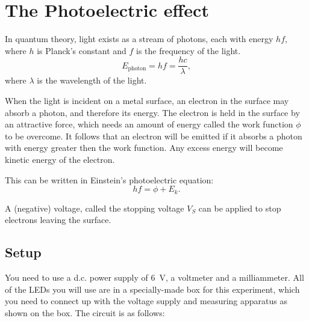 \section{The Photoelectric effect}
\label{photoelectric}

In quantum theory, light exists as a stream of photons, each with energy $hf$, where $h$ is Planck's constant and $f$ is the frequency of the light.
\[E_{\text{photon}}=hf=\frac{hc}{\lambda},\]
where $\lambda$ is the wavelength of the light.

When the light is incident on a metal surface, an electron in the surface may absorb a photon, and therefore its energy.  The electron is held in the surface by an attractive force, which needs an amount of energy called the work function $\phi$ to be overcome.  It follows that an electron will be emitted if it absorbs a photon with energy greater then the work function.  Any excess energy will become kinetic energy of the electron.

This can be written in Einstein's photoelectric equation:
\[hf=\phi+E_{k}.\]

A (negative) voltage, called the stopping voltage $V_{S}$ can be applied to stop electrons leaving the surface.

\subsection{Setup}

You need to use a d.c. power supply of \SI{6}{V}, a voltmeter and a milliammeter.  All of the LEDs you will use are in a specially-made box for this experiment, which you need to connect up with the voltage supply and measuring apparatus as shown on the box.  The circuit is as follows:\\

